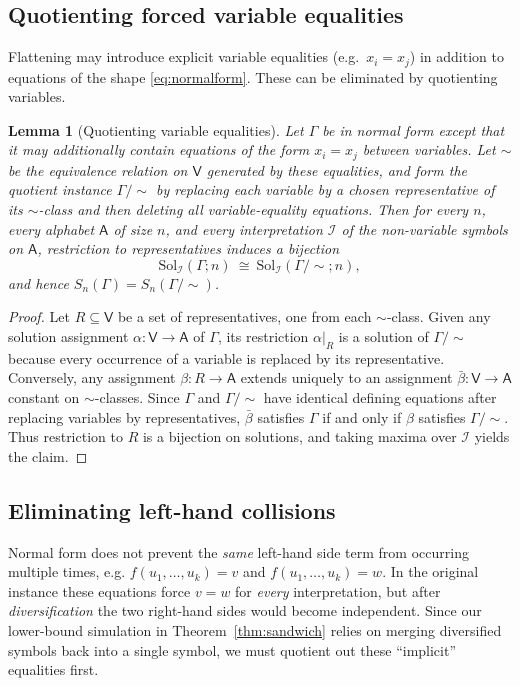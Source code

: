 \documentclass[11pt]{article}
\theoremstyle{definition}
\theoremstyle{plain}
\newtheorem{lemma}[definition]{Lemma}
\newcommand{\A}{\mathsf{A}}
\newcommand{\Vars}{\mathsf{V}}
\newcommand{\Sol}{\mathrm{Sol}}
\newcommand{\Sn}{S_n}
\begin{document}
\subsection{Quotienting forced variable equalities}
Flattening may introduce explicit variable equalities (e.g.\ $x_i=x_j$) in addition to equations of the
shape \eqref{eq:normalform}.  These can be eliminated by quotienting variables.

\begin{lemma}[Quotienting variable equalities]
\label{lem:quotient}
Let $\Gamma$ be in normal form except that it may additionally contain equations of the form $x_i=x_j$
between variables.
Let $\sim$ be the equivalence relation on $\Vars$ generated by these equalities, and form the quotient
instance $\Gamma/\!\sim$ by replacing each variable by a chosen representative of its $\sim$-class and then
deleting all variable-equality equations.
Then for every $n$, every alphabet $\A$ of size $n$, and every interpretation $\mathcal I$ of the non-variable symbols on $\A$, restriction
to representatives induces a bijection
\[
\Sol_\mathcal I(\Gamma;n)\ \cong\ \Sol_\mathcal I(\Gamma/\!\sim;n),
\]
and hence $\Sn(\Gamma)=\Sn(\Gamma/\!\sim)$.
\end{lemma}

\begin{proof}
Let $R\subseteq \Vars$ be a set of representatives, one from each $\sim$-class.
Given any solution assignment $\alpha:\Vars\to\A$ of $\Gamma$, its restriction $\alpha|_R$ is a solution of
$\Gamma/\!\sim$ because every occurrence of a variable is replaced by its representative.
Conversely, any assignment $\beta:R\to\A$ extends uniquely to an assignment $\bar\beta:\Vars\to\A$ constant on
$\sim$-classes.  Since $\Gamma$ and $\Gamma/\!\sim$ have identical defining equations after replacing
variables by representatives, $\bar\beta$ satisfies $\Gamma$ if and only if $\beta$ satisfies $\Gamma/\!\sim$.
Thus restriction to $R$ is a bijection on solutions, and taking maxima over $\mathcal I$ yields the claim.
\end{proof}


\subsection{Eliminating left-hand collisions}
\label{subsec:collisions}
Normal form does not prevent the \emph{same} left-hand side term from occurring multiple times, e.g.
\(f(u_1,\dots,u_k)=v\) and \(f(u_1,\dots,u_k)=w\).
In the original instance these equations force $v=w$ for \emph{every} interpretation, but after
\emph{diversification} the two right-hand sides would become independent.
Since our lower-bound simulation in Theorem~\ref{thm:sandwich} relies on merging diversified symbols back
into a single symbol, we must quotient out these ``implicit'' equalities first.
\end{document}
